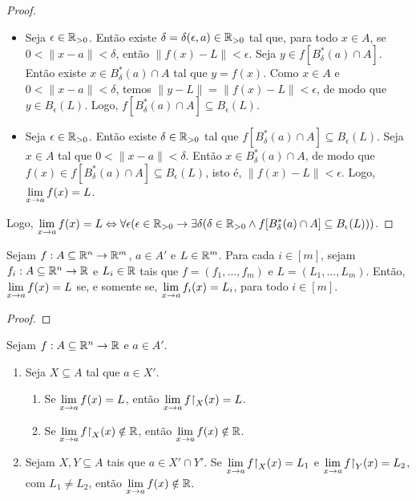 \begin{proof}
    \leavevmode
        \begin{itemize}[align=left]
            \item[($\Rightarrow$)] Seja $\epsilon \in \mathbb{R}_{>0}$. Então existe $\delta = \delta(\epsilon, a) \in \mathbb{R}_{>0}$ tal que, para todo $x \in A$, se $0 < \|x-a\| < \delta$, então $\|f(x) - L\| < \epsilon$. Seja $y \in f[B^*_{\delta}(a) \cap A]$. Então existe $x \in B^*_{\delta}(a) \cap A$ tal que $y = f(x)$. Como $x \in A$ e $0 < \|x-a\| < \delta$, temos $\|y - L\| = \|f(x) - L\| < \epsilon$, de modo que $y \in B_{\epsilon}(L)$. Logo, $f[B^*_{\delta}(a) \cap A] \subseteq B_{\epsilon}(L)$.
            \item[($\Leftarrow$)] Seja $\epsilon \in \mathbb{R}_{>0}$. Então existe $\delta \in \mathbb{R}_{>0}$ tal que $f[B^*_{\delta}(a) \cap A] \subseteq B_{\epsilon}(L)$. Seja $x \in A$ tal que $0 < \|x-a\| < \delta$. Então $x \in B^*_{\delta}(a) \cap A$, de modo que $f(x) \in f[B^*_{\delta}(a) \cap A] \subseteq B_{\epsilon}(L)$, isto é, $\|f(x) - L\| < \epsilon$. Logo, $\displaystyle \lim_{x \to a} f(x) = L$.
        \end{itemize}
    Logo, $\displaystyle \lim_{x \to a} f(x) = L \Leftrightarrow \forall \epsilon(\epsilon \in \mathbb{R}_{>0} \rightarrow \exists \delta (\delta \in \mathbb{R}_{>0} \land f[B^*_{\delta}(a) \cap A] \subseteq B_{\epsilon}(L)))$. \blackproof
\end{proof}

\begin{proposition}
    Sejam $f : A \subseteq \mathbb{R}^n \to \mathbb{R}^m$, $a \in A'$ e $L \in \mathbb{R}^m$. Para cada $i \in [m]$, sejam $f_i : A \subseteq \mathbb{R}^n \to \mathbb{R}$ e $L_i \in \mathbb{R}$ tais que $f = (f_1, \ldots, f_m)$ e $L = (L_1, \ldots, L_m)$. Então, $\displaystyle \lim_{x \to a} f(x) = L$ se, e somente se, $\displaystyle \lim_{x \to a} f_i(x) = L_i$, para todo $i \in [m]$.
\end{proposition}

\begin{proof}
    \blackproof
\end{proof}

\begin{proposition}
    Sejam $f : A \subseteq \mathbb{R}^n \to \mathbb{R}$ e $a \in A'$.
        \begin{enumerate}[leftmargin=*, align=left, label=\textbf{(\alph*)}]
            \item Seja $X \subseteq A$ tal que $a \in X'$.
                \begin{enumerate}[label=\roman*.]
                    \item Se $\displaystyle \lim_{x \to a} f(x) = L$, então $\ds \lim_{x \to a} f \restriction_X (x) = L$.
                    \item Se $\ds \lim_{x \to a} f \restriction_X (x) \notin \R$, então $\displaystyle \lim_{x \to a} f (x) \notin \mathbb{R}$. 
                \end{enumerate}
            \item Sejam $X,Y \subseteq A$ tais que $a \in X' \cap Y'$. Se $\ds \lim_{x \to a} f \restriction_X (x) = L_1$ e $\ds \lim_{x \to a} f \restriction_Y (x) = L_2$, com $L_1 \neq L_2$, então $\displaystyle \lim_{x \to a} f (x) \notin \mathbb{R}$.
        \end{enumerate}
\end{proposition}

